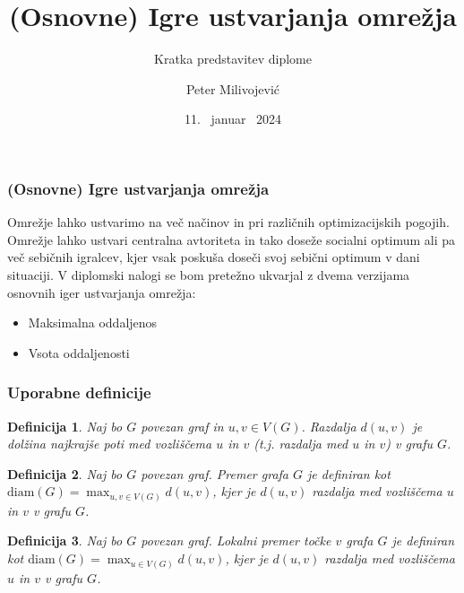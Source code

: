 \documentclass[12pt, hyperref={unicode}]{beamer}
\title{(Osnovne) Igre ustvarjanja omrežja}
\subtitle{Kratka predstavitev diplome}
\author{Peter Milivojević}
\institute[FMF]{Fakulteta za matematiko in fiziko}
\date{11. \ januar \ 2024}
\newtheorem{definicija}{Definicija}
\begin{document}
\begin{frame}
    \titlepage
\end{frame}


\begin{frame}
   
  \frametitle{(Osnovne) Igre ustvarjanja omrežja}
  Omrežje lahko ustvarimo na več načinov in pri različnih optimizacijskih pogojih.
  Omrežje lahko ustvari centralna avtoriteta in tako doseže socialni optimum ali pa
  več sebičnih igralcev, kjer vsak poskuša doseči svoj sebični optimum v dani situaciji.
  V diplomski nalogi se bom pretežno ukvarjal z dvema verzijama osnovnih iger ustvarjanja omrežja:
  \vspace{1mm}
  \begin{itemize}
    \item Maksimalna oddaljenos
    \item Vsota oddaljenosti
  \end{itemize}

\end{frame}

\begin{frame}
   
    \frametitle{Uporabne definicije}
    \begin{definicija}
        Naj bo $G$ povezan graf in $u, v \in V(G)$. Razdalja $d(u, v)$ je dolžina najkrajše poti med vozliščema $u$ in $v$ (t.j. razdalja med $u$ in $v$) v grafu $G$.
    \end{definicija}

    \begin{definicija}
        Naj bo $G$ povezan graf. Premer grafa $G$ je definiran kot $\text{diam}(G) = \max_{u, v \in V(G)} d(u, v)$, kjer je $d(u, v)$ razdalja med vozliščema $u$ in $v$ v grafu $G$.
    \end{definicija}

    \begin{definicija}
        Naj bo $G$ povezan graf. Lokalni premer točke $v$ grafa $G$ je definiran kot $\text{diam}(G) = \max_{u \in V(G)} d(u, v)$, kjer je $d(u, v)$ razdalja med vozliščema $u$ in $v$ v grafu $G$.
    \end{definicija}

\end{frame}
\end{document}
